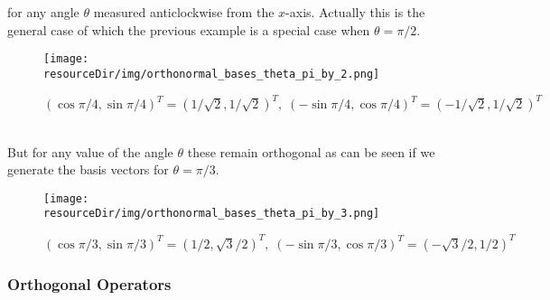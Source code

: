 \documentclass[../MathsNotesBase.tex]{subfiles}
\begin{document}
{			for any angle $\theta$ measured anticlockwise from the $x$-axis. Actually this is the general case of which the previous example is a special case when ${ \theta = \pi / 2 }$.			
			\begin{figure}[h!]
				\texttt{[image: \\resourceDir/img/orthonormal\_bases\_theta\_pi\_by\_2.png]}
				\caption{$ (\cos{\pi/4}, \sin{\pi/4})^T = (1/\sqrt{2}, 1/\sqrt{2})^T,\;  (-\sin{\pi/4}, \cos{\pi/4})^T = (-1/\sqrt{2}, 1/\sqrt{2})^T $}
			\end{figure}
			\\But for any value of the angle $\theta$ these remain orthogonal as can be seen if we generate the basis vectors for ${ \theta = \pi/3 }$.
			\begin{figure}[h!]
				\texttt{[image: \\resourceDir/img/orthonormal\_bases\_theta\_pi\_by\_3.png]}
				\caption{$ (\cos{\pi/3}, \sin{\pi/3})^T = (1/2, \sqrt{3}/2)^T,\;  (-\sin{\pi/3}, \cos{\pi/3})^T = (-\sqrt{3}/2, 1/2)^T $}
			\end{figure}
	
		
		\bigskip\bigskip
		\subsubsection{Orthogonal Operators}
		\bigskip
	
}
\end{document}
